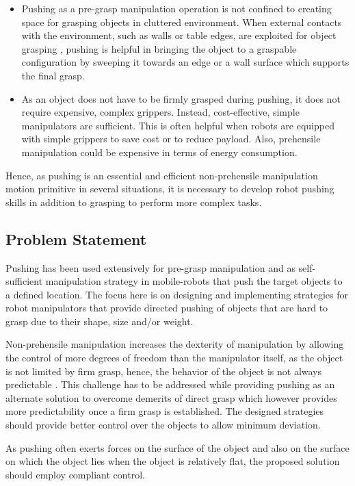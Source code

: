 \documentclass[rnd]{mas_proposal}
\begin{document}
\begin{itemize}
\item Pushing as a pre-grasp manipulation operation is not confined to creating space for grasping objects in cluttered environment. When external contacts with the environment, such as walls or table edges, are exploited for object grasping \cite{eppner2015planning}, pushing is helpful in bringing the object to a graspable configuration by sweeping it towards an edge or a wall surface which supports the final grasp.


\item As an object does not have to be firmly grasped during pushing, it does not require expensive, complex grippers. Instead, cost-effective, simple manipulators are sufficient. This is often helpful when robots are equipped with simple grippers to save cost or to reduce payload. Also, prehensile manipulation could be expensive in terms of energy consumption.
\end{itemize}

Hence, as pushing is an essential and efficient non-prehensile manipulation motion primitive in several situations, it is necessary to develop robot pushing skills in addition to grasping to perform more complex tasks.


\subsection{Problem Statement}
Pushing has been used extensively for pre-grasp manipulation and as self-sufficient manipulation strategy in mobile-robots that push the target objects to a defined location. The focus here is on designing and implementing strategies for robot manipulators that provide directed pushing of objects that are hard to grasp due to their shape, size and/or weight. 

Non-prehensile manipulation increases the dexterity of manipulation by allowing the control of more degrees of freedom than the manipulator itself, as the object is not limited by firm grasp, hence, the behavior of the object is not always predictable \cite{ruggiero2018nonprehensile}. This challenge has to be addressed while providing pushing as an alternate solution to overcome demerits of direct grasp which however provides more predictability once a firm grasp is established. The designed strategies should provide better control over the objects to allow minimum deviation.

As pushing often exerts forces on the surface of the object and also on the surface on which the object lies when the object is relatively flat, the proposed solution should employ compliant control.
\end{document}
